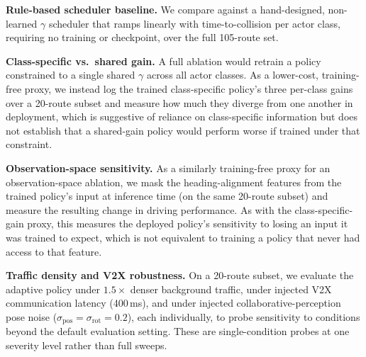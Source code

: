 \textbf{Rule-based scheduler baseline.} We compare against a hand-designed, non-learned $\gamma$ scheduler that ramps linearly with time-to-collision per actor class, requiring no training or checkpoint, over the full 105-route set.

\textbf{Class-specific vs.\ shared gain.} A full ablation would retrain a policy constrained to a single shared $\gamma$ across all actor classes. As a lower-cost, training-free proxy, we instead log the trained class-specific policy's three per-class gains over a 20-route subset and measure how much they diverge from one another in deployment, which is suggestive of reliance on class-specific information but does not establish that a shared-gain policy would perform worse if trained under that constraint.

\textbf{Observation-space sensitivity.} As a similarly training-free proxy for an observation-space ablation, we mask the heading-alignment features from the trained policy's input at inference time (on the same 20-route subset) and measure the resulting change in driving performance. As with the class-specific-gain proxy, this measures the deployed policy's sensitivity to losing an input it was trained to expect, which is not equivalent to training a policy that never had access to that feature.

\textbf{Traffic density and V2X robustness.} On a 20-route subset, we evaluate the adaptive policy under $1.5\times$ denser background traffic, under injected V2X communication latency (400\,ms), and under injected collaborative-perception pose noise ($\sigma_{\text{pos}}=\sigma_{\text{rot}}=0.2$), each individually, to probe sensitivity to conditions beyond the default evaluation setting. These are single-condition probes at one severity level rather than full sweeps.